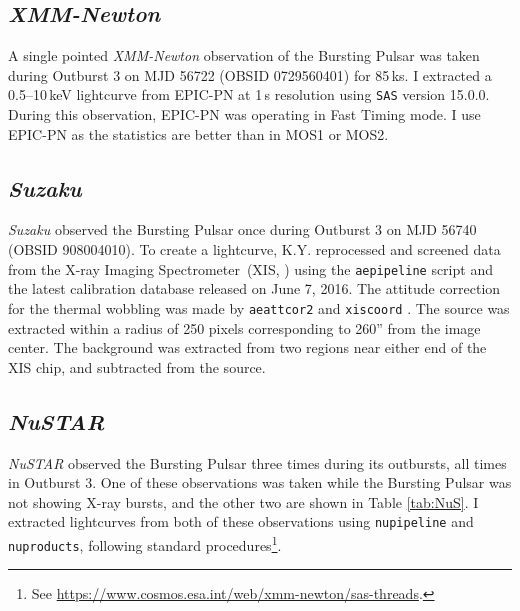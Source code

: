\subsection{\textit{XMM-Newton}}

\par A single pointed \indexxmm\textit{XMM-Newton} observation of the Bursting Pulsar was taken during Outburst 3 on MJD 56722 (OBSID 0729560401) for 85\,ks.  I extracted a 0.5--10\,keV lightcurve from EPIC\indexepic-PN at 1\,s resolution using \texttt{SAS} version 15.0.0.  During this observation, EPIC-PN was operating in Fast Timing mode.  I use EPIC-PN as the statistics are better than in MOS1 or MOS2.

\subsection{\textit{Suzaku}}
\par \indexsuzaku\textit{Suzaku} observed the Bursting Pulsar once during Outburst 3 on MJD 56740 (OBSID 908004010).  To create a lightcurve, \textsf{K.Y.} reprocessed and screened data from the X-ray Imaging Spectrometer\indexxis\ (XIS, \citealp{Koyama_XIS}) using the \texttt{aepipeline} script and the latest calibration database released on June 7, 2016.  The attitude correction for the thermal wobbling was made by \texttt{aeattcor2} and \texttt{xiscoord} \citep{Uchiyama_SuzPSF}. The source was extracted within a radius of 250 pixels corresponding to 260'' from the image center.  The background was extracted from two regions near either end of the XIS chip, and subtracted from the source.

\subsection{\textit{NuSTAR}}

\par \indexnustar\textit{NuSTAR} observed the Bursting Pulsar three times during its outbursts, all times in Outburst 3.  One of these observations was taken while the Bursting Pulsar was not showing X-ray bursts, and the other two are shown in Table \ref{tab:NuS}.  I extracted lightcurves from both of these observations using \texttt{nupipeline} and \texttt{nuproducts}, following standard procedures\footnote{See \url{https://www.cosmos.esa.int/web/xmm-newton/sas-threads}.}.

